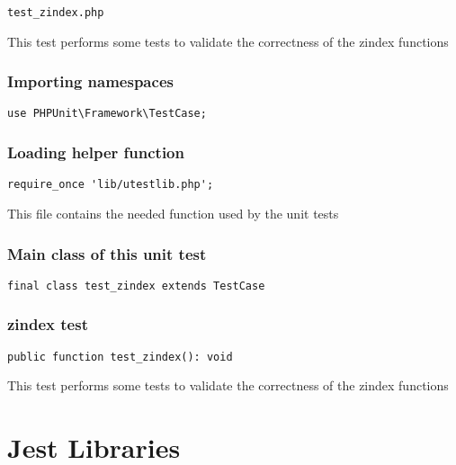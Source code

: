 \documentclass[a4paper]{article}
\begin{document}
\begin{lstlisting}
test_zindex.php
\end{lstlisting}

This test performs some tests to validate the correctness
of the zindex functions

\hypertarget{toc434}{}
\subsubsection{Importing namespaces}

\begin{lstlisting}
use PHPUnit\Framework\TestCase;
\end{lstlisting}

\hypertarget{toc435}{}
\subsubsection{Loading helper function}

\begin{lstlisting}
require_once 'lib/utestlib.php';
\end{lstlisting}

This file contains the needed function used by the unit tests

\hypertarget{toc436}{}
\subsubsection{Main class of this unit test}

\begin{lstlisting}
final class test_zindex extends TestCase
\end{lstlisting}

\hypertarget{toc437}{}
\subsubsection{zindex test}

\begin{lstlisting}
public function test_zindex(): void
\end{lstlisting}

This test performs some tests to validate the correctness
of the zindex functions


\hypertarget{toc438}{}
\section{Jest Libraries}

\hypertarget{toc439}{}
\end{document}
